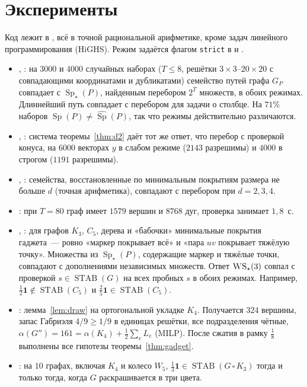 \documentclass[a4paper,11pt]{article}
\theoremstyle{plain}
\theoremstyle{definition}
\theoremstyle{remark}
\DeclareMathOperator{\Sp}{Sp}
\DeclareMathOperator{\STAB}{STAB}
\newcommand{\WS}{\textsc{WS}}
\newcommand{\Spm}{\Sp_\star}
\begin{document}
\section{Эксперименты}

Код лежит в , всё в точной рациональной арифметике, кроме задач линейного программирования (HiGHS). Режим задаётся флагом \texttt{strict} в  и .
\begin{itemize}
    \item {}, : на $3000$ и $4000$ случайных наборах ($T\le8$, решётки $3\times3$--$20\times20$ с совпадающими координатами и дубликатами) семейство путей графа $G_P$ совпадает с $\Spm(P)$, найденным перебором $2^T$ множеств, в обоих режимах. Длиннейший путь совпадает с перебором для задачи о столбце. На $71\%$ наборов $\Sp(P)\ne\widehat{\Sp}(P)$, так что режимы действительно различаются.
    \item {}, : система теоремы~\ref{thm:d2} даёт тот же ответ, что перебор с проверкой конуса, на $6000$ векторах $y$ в слабом режиме ($2143$ разрешимы) и $4000$ в строгом ($1191$ разрешимы).
    \item {}, : семейства, восстановленные по минимальным покрытиям размера не больше $d$ (точная арифметика), совпадают с перебором при $d=2,3,4$.
    \item {}: при $T=80$ граф имеет $1579$ вершин и $8768$ дуг, проверка занимает $1{,}8$~с.
    \item {}, : для графов $K_3$, $C_5$, дерева и «бабочки» минимальные покрытия гаджета~--- ровно «маркер покрывает всё» и «пара $uv$ покрывает тяжёлую точку». Множества из $\Spm(P)$, содержащие маркер и тяжёлые точки, совпадают с дополнениями независимых множеств. Ответ $\WS_\star(3)$ совпал с проверкой $s\in\STAB(G)$ на всех пробных $s$ в обоих режимах. Например, $\tfrac12\mathbf 1\notin\STAB(C_5)$ и $\tfrac25\mathbf 1\in\STAB(C_5)$.
    \item {}: лемма~\ref{lem:draw} на ортогональной укладке $K_4$. Получается $324$ вершины, запас Габриэля $4/9\ge1/9$ в единицах решётки, все подразделения чётные, $\alpha(G'')=161=\alpha(K_4)+\tfrac12\sum_eL_e$ (MILP). После сжатия в рамку $\tfrac18$ выполнены все гипотезы теоремы~\ref{thm:gadget}.
    \item {}: на $10$ графах, включая $K_4$ и колесо $W_5$, $\tfrac13\mathbf 1\in\STAB(G\,\square\,K_3)$ тогда и только тогда, когда $G$ раскрашивается в три цвета.
\end{itemize}
\end{document}
